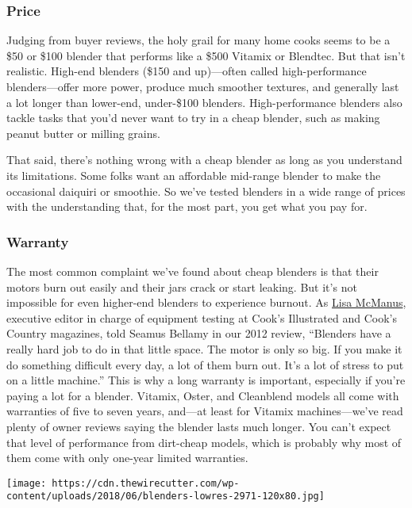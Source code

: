\hypertarget{price}{%
\subsubsection{Price}\label{price}}

Judging from buyer reviews, the holy grail for many home cooks seems to
be a \$50 or \$100 blender that performs like a \$500 Vitamix or
Blendtec. But that isn't realistic. High-end blenders (\$150 and
up)---often called high-performance blenders---offer more power, produce
much smoother textures, and generally last a lot longer than lower-end,
under-\$100 blenders. High-performance blenders also tackle tasks that
you'd never want to try in a cheap blender, such as making peanut butter
or milling grains.

That said, there's nothing wrong with a cheap blender as long as you
understand its limitations. Some folks want an affordable mid-range
blender to make the occasional daiquiri or smoothie. So we've tested
blenders in a wide range of prices with the understanding that, for the
most part, you get what you pay for.

\hypertarget{warranty}{%
\subsubsection{Warranty}\label{warranty}}

The most common complaint we've found about cheap blenders is that their
motors burn out easily and their jars crack or start leaking. But it's
not impossible for even higher-end blenders to experience burnout. As
\href{https://www.americastestkitchen.com/tour}{Lisa McManus}, executive
editor in charge of equipment testing at Cook's Illustrated and Cook's
Country magazines, told Seamus Bellamy in our 2012 review, ``Blenders
have a really hard job to do in that little space. The motor is only so
big. If you make it do something difficult every day, a lot of them burn
out. It's a lot of stress to put on a little machine.'' This is why a
long warranty is important, especially if you're paying a lot for a
blender. Vitamix, Oster, and Cleanblend models all come with warranties
of five to seven years, and---at least for Vitamix machines---we've read
plenty of owner reviews saying the blender lasts much longer. You can't
expect that level of performance from dirt-cheap models, which is
probably why most of them come with only one-year limited warranties.

\texttt{[image: https://cdn.thewirecutter.com/wp-content/uploads/2018/06/blenders-lowres-2971-120x80.jpg]}

